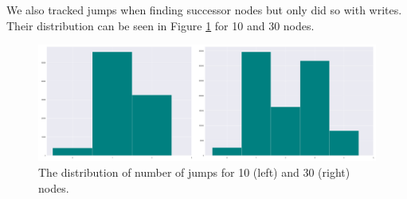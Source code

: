 We also tracked jumps when finding successor nodes but only did so with writes. Their distribution can be seen in Figure \ref{fig:jumps} for 10 and 30 nodes. 
\begin{figure}[ht!]
    \centering
    \includegraphics[scale=0.065]{img/jumps.png}
    \caption{The distribution of number of jumps for 10 (left) and 30 (right) nodes.}
    \label{fig:jumps}
\end{figure}